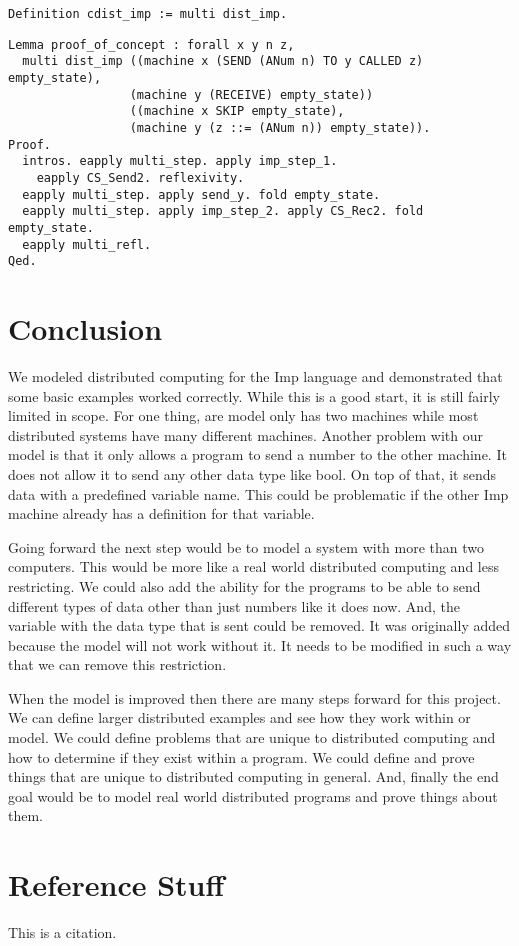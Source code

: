 \documentclass{llncs}
\begin{document}
\begin{lstlisting}
Definition cdist_imp := multi dist_imp.
\end{lstlisting}

\begin{lstlisting}
Lemma proof_of_concept : forall x y n z,
  multi dist_imp ((machine x (SEND (ANum n) TO y CALLED z) empty_state),
                 (machine y (RECEIVE) empty_state))
                 ((machine x SKIP empty_state), 
                 (machine y (z ::= (ANum n)) empty_state)).
Proof. 
  intros. eapply multi_step. apply imp_step_1. 
    eapply CS_Send2. reflexivity.
  eapply multi_step. apply send_y. fold empty_state. 
  eapply multi_step. apply imp_step_2. apply CS_Rec2. fold empty_state. 
  eapply multi_refl.   
Qed.
\end{lstlisting}

\section{Conclusion}
We modeled distributed computing for the Imp language and demonstrated that some basic examples worked correctly. While this is a good start, it is still fairly limited in scope. For one thing, are model only has two machines while most distributed systems have many different machines. Another problem with our model is that it only allows a program to send a number to the other machine. It does not allow it to send any other data type like bool. On top of that, it sends data with a predefined variable name. This could be problematic if the other Imp machine already has a definition for that variable. 

Going forward the next step would be to model a system with more than two computers. This would be more like a real world distributed computing and less restricting. We could also add the ability for the programs to be able to send different types of data other than just numbers like it does now. And, the variable with the data type that is sent could be removed. It was originally added because the model will not work without it. It needs to be modified in such a way that we can remove this restriction. 

When the model is improved then there are many steps forward for this project. We can define larger distributed examples and see how they work within or model. We could define problems that are unique to distributed computing and how to determine if they exist within a program. We could define and prove things that are unique to distributed computing in general. And, finally the end goal would be to model real world distributed programs and prove things about them. 

\section{Reference Stuff}
This is a citation.~\cite{gennaro2010non}



\end{document}
